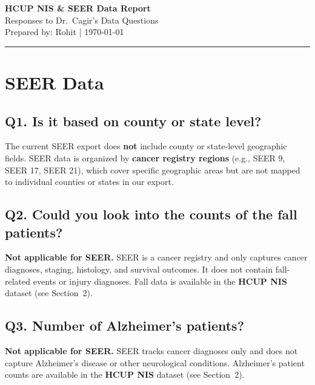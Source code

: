 \documentclass[11pt, a4paper]{article}
\begin{document}
\begin{center}
  {\LARGE \textbf{\color{seerblue} HCUP NIS \& SEER Data Report}}\\[6pt]
  {\large Responses to Dr.\ Cagir's Data Questions}\\[4pt]
  {\small Prepared by: Rohit \quad | \quad \today}
\end{center}
\vspace{4pt}
\noindent\rule{\linewidth}{0.8pt}
\vspace{4pt}

\section{SEER Data}

\subsection*{Q1. Is it based on county or state level?}
\begin{answerbox}
The current SEER export does \textbf{not} include county or state-level geographic fields. SEER data is organized by \textbf{cancer registry regions} (e.g., SEER 9, SEER 17, SEER 21), which cover specific geographic areas but are not mapped to individual counties or states in our export.
\end{answerbox}

\vspace{6pt}

\subsection*{Q2. Could you look into the counts of the fall patients?}
\begin{answerbox}
\textbf{Not applicable for SEER.} SEER is a cancer registry and only captures cancer diagnoses, staging, histology, and survival outcomes. It does not contain fall-related events or injury diagnoses. Fall data is available in the \textbf{HCUP NIS} dataset (see Section~2).
\end{answerbox}

\vspace{6pt}

\subsection*{Q3. Number of Alzheimer's patients?}
\begin{answerbox}
\textbf{Not applicable for SEER.} SEER tracks cancer diagnoses only and does not capture Alzheimer's disease or other neurological conditions. Alzheimer's patient counts are available in the \textbf{HCUP NIS} dataset (see Section~2).
\end{answerbox}
\end{document}
